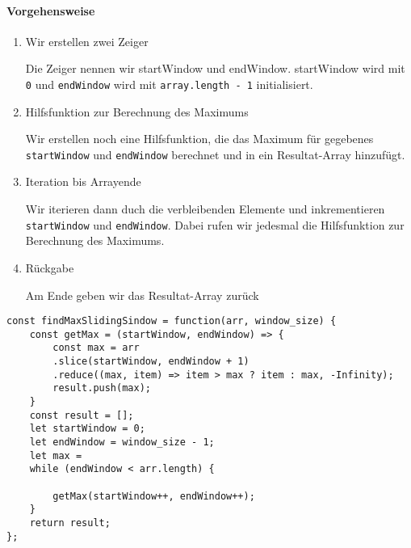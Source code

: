 \documentclass{book}
\begin{document}
\paragraph{Vorgehensweise}
\begin{enumerate} 
	\item Wir erstellen zwei Zeiger
	
	Die Zeiger nennen wir startWindow und endWindow. startWindow wird mit \lstinline|0| und \lstinline|endWindow| wird mit \lstinline|array.length - 1| initialisiert. 
	
	\item Hilfsfunktion zur Berechnung des Maximums
	
	Wir erstellen noch eine Hilfsfunktion, die das Maximum für gegebenes \lstinline|startWindow| und \lstinline|endWindow| berechnet und in ein Resultat-Array hinzufügt.
	
	\item Iteration bis Arrayende
	
	Wir iterieren dann duch die verbleibenden Elemente und inkrementieren \lstinline|startWindow| und \lstinline|endWindow|. Dabei rufen wir jedesmal die Hilfsfunktion zur Berechnung des Maximums.
	
	\item Rückgabe
	
	Am Ende geben wir das Resultat-Array zurück
\end{enumerate}

\begin{lstlisting}[caption=My Javascript Example]
const findMaxSlidingSindow = function(arr, window_size) {
	const getMax = (startWindow, endWindow) => {
		const max = arr
		.slice(startWindow, endWindow + 1)
		.reduce((max, item) => item > max ? item : max, -Infinity);
		result.push(max);
	}
	const result = [];
	let startWindow = 0;
	let endWindow = window_size - 1;
	let max = 
	while (endWindow < arr.length) {
		
		getMax(startWindow++, endWindow++);    
	}
	return result;
};
\end{lstlisting}
\end{document}
